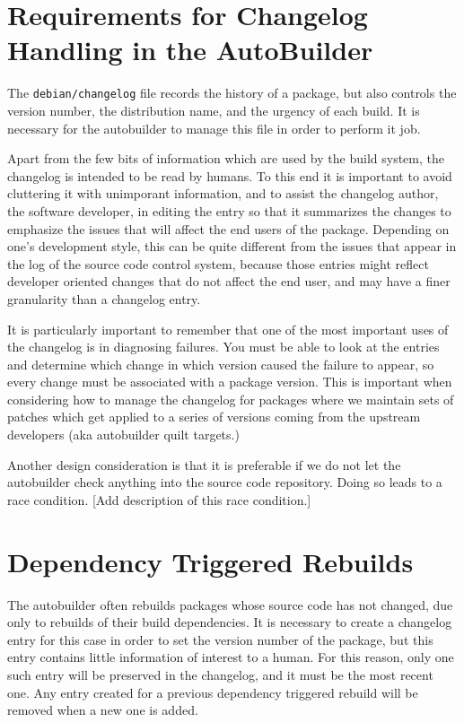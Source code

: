 \documentclass[12pt]{article}
\begin{document}
\section{Requirements for Changelog Handling in the AutoBuilder}

The {\tt debian/changelog} file records the history of a package, but
also controls the version number, the distribution name, and the
urgency of each build.  It is necessary for the autobuilder to manage
this file in order to perform it job.

Apart from the few bits of information which are used by the build
system, the changelog is intended to be read by humans.  To this end
it is important to avoid cluttering it with unimporant information,
and to assist the changelog author, the software developer, in editing
the entry so that it summarizes the changes to emphasize the issues
that will affect the end users of the package.  Depending on one's
development style, this can be quite different from the issues that
appear in the log of the source code control system, because those
entries might reflect developer oriented changes that do not affect
the end user, and may have a finer granularity than a changelog entry.

It is particularly important to remember that one of the most
important uses of the changelog is in diagnosing failures.  You must
be able to look at the entries and determine which change in which
version caused the failure to appear, so every change must be
associated with a package version.  This is important when considering
how to manage the changelog for packages where we maintain sets of
patches which get applied to a series of versions coming from the
upstream developers (aka autobuilder quilt targets.)

Another design consideration is that it is preferable if we do not let
the autobuilder check anything into the source code repository.  Doing
so leads to a race condition.  [Add description of this race condition.]

\section{Dependency Triggered Rebuilds}

The autobuilder often rebuilds packages whose source code has not
changed, due only to rebuilds of their build dependencies.  It is
necessary to create a changelog entry for this case in order to set
the version number of the package, but this entry contains little
information of interest to a human.  For this reason, only one such
entry will be preserved in the changelog, and it must be the most
recent one.  Any entry created for a previous dependency triggered
rebuild will be removed when a new one is added.
\end{document}
